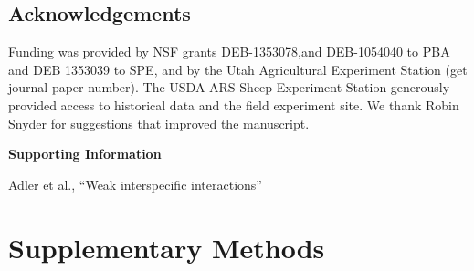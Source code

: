\documentclass[11pt]{article}
\begin{document}
\begin{doublespacing}
\section*{Acknowledgements}

Funding was provided by NSF grants DEB-1353078,and  DEB-1054040 to PBA and DEB 1353039 to SPE, and by the Utah Agricultural Experiment Station (get journal paper number). The USDA-ARS Sheep Experiment Station generously provided access to historical data and the field experiment site.  We thank Robin Snyder for suggestions that improved the manuscript.





\end{doublespacing} 


\clearpage 
\newpage 

\setcounter{page}{1}
\setcounter{equation}{0}
\setcounter{figure}{0}
\setcounter{section}{0}
\setcounter{table}{0}
\renewcommand{\theequation}{SI.\arabic{equation}}
\renewcommand{\thetable}{SI-\arabic{table}}
\renewcommand{\thefigure}{SI-\arabic{figure}}
\renewcommand{\thesection}{Section SI.\arabic{section}}

\centerline{\Large \textbf{Supporting Information }}
\centerline{Adler et al., ``Weak interspecific interactions''} 

\vspace{0.4in} 

\section{Supplementary Methods} \label{suppMethods}
\end{document}
